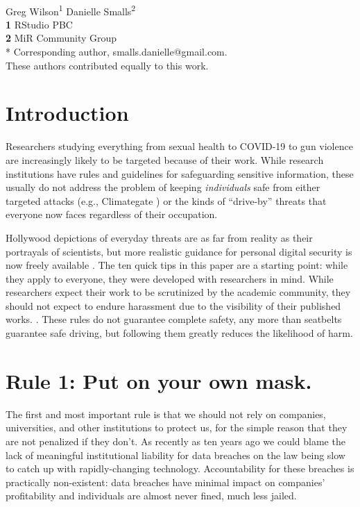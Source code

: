\documentclass[10pt, letterpaper]{article}
\begin{document}
\vspace*{0.2in}

\begin{flushleft}
{\Large
\textbf{}
}
\newline
\\
{Greg Wilson}\textsuperscript{1{\ddag}}
{Danielle Smalls}\textsuperscript{2{\ddag}}
\\
\bigskip
\textbf{1} RStudio PBC\\
\textbf{2} MiR Community Group\\
* Corresponding author, smalls.danielle@gmail.com. \\
\bigskip
{\ddag} These authors contributed equally to this work.
\end{flushleft}

\section*{Introduction}

Researchers studying everything from sexual health to COVID-19 to gun violence
are increasingly likely to be targeted because of their work.  While research
institutions have rules and guidelines for safeguarding sensitive information,
these usually do not address the problem of keeping \emph{individuals} safe from
either targeted attacks (e.g., Climategate \cite{Natu2010}) or the kinds of
``drive-by'' threats that everyone now faces regardless of their occupation.

Hollywood depictions of everyday threats are as far from reality as their
portrayals of scientists, but more realistic guidance for personal digital
security is now freely available \cite{FLD,EFJ2015,EFF}. The ten quick tips in
this paper are a starting point: while they apply to everyone, they were
developed with researchers in mind. While researchers expect their work to be
scrutinized by the academic community, they should not expect to endure
harassment due to the visibility of their published works. . These rules do not
guarantee complete safety, any more than seatbelts guarantee safe driving, but
following them greatly reduces the likelihood of harm.

\section*{Rule 1: Put on your own mask.}

The first and most important rule is that we should not rely on companies,
universities, and other institutions to protect us, for the simple reason that
they are not penalized if they don't. As recently as ten years ago we could
blame the lack of meaningful institutional liability for data breaches on the
law being slow to catch up with rapidly-changing technology. Accountability for
these breaches is practically non-existent: data breaches have minimal impact on
companies' profitability and individuals are almost never fined, much less
jailed.
\end{document}
